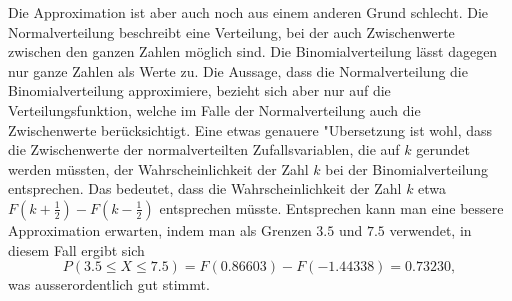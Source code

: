 \begin{loesung}
\begin{teilaufgaben}
Die Approximation ist aber auch noch aus einem anderen Grund schlecht.
Die Normalverteilung beschreibt eine Verteilung, bei der auch Zwischenwerte
zwischen den ganzen Zahlen möglich sind. Die Binomialverteilung lässt
dagegen nur ganze Zahlen als Werte zu. Die Aussage, dass die Normalverteilung
die Binomialverteilung approximiere, bezieht sich aber nur auf die
Verteilungsfunktion, welche im Falle der Normalverteilung auch die
Zwischenwerte berücksichtigt. Eine etwas genauere "Ubersetzung
ist wohl, dass die Zwischenwerte der normalverteilten Zufallsvariablen,
die auf $k$ gerundet werden müssten, der Wahrscheinlichkeit der Zahl
$k$ bei der Binomialverteilung entsprechen. Das bedeutet, dass die
Wahrscheinlichkeit der Zahl $k$ etwa $F(k+\frac12)-F(k-\frac12)$
entsprechen müsste.
Entsprechen kann man eine
bessere Approximation erwarten, indem man als Grenzen
$3.5$ und $7.5$ verwendet, in diesem Fall ergibt sich
\[
P(3.5\le X\le 7.5)=F(0.86603)-F(-1.44338)=0.73230,
\]
was ausserordentlich gut stimmt.
\qedhere
\end{teilaufgaben}
\end{loesung}

